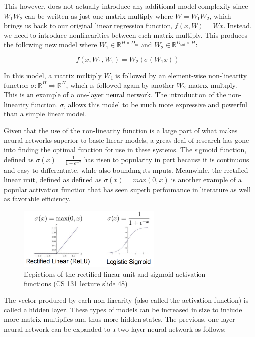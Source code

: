 \documentclass{article}
\begin{document}
This however, does not actually introduce any additional model complexity since $W_1W_2$ can be written as just one matrix multiply where $W = W_1W_2$, which brings us back to our original linear regression function, $f(x, W) = Wx$. Instead, we need to introduce nonlinearities between each matrix multiply. This produces the following new model where $W_1\in \mathbb{R}^{H \times D_{in}}$ and $W_2\in \mathbb{R}^{D_{out} \times H}$:

$$f(x,W_1,W_2) = W_2(\sigma(W_1x))$$ 

In this model, a matrix multiply $W_1$ is followed by an element-wise non-linearity function $\sigma : \mathbb{R}^H \Rightarrow \mathbb{R}^H$, which is followed again by another $W_2$ matrix multiply. This is an example of a one-layer neural network. The introduction of the non-linearity function, $\sigma$, allows this model to be much more expressive and powerful than a simple linear model.  

Given that the use of the non-linearity function is a large part of what makes neural networks superior to basic linear models, a great deal of research has gone into finding the optimal function for use in these systems. The sigmoid function, defined as $\sigma(x) = \frac{1}{1+e^{-x}}$ has risen to popularity in part because it is continuous and easy to differentiate, while also bounding its inputs. Meanwhile, the rectified linear unit, defined as defined as $\sigma(x) = max(0,x)$ is another example of a popular activation function that has seen superb performance in literature as well as favorable efficiency.

\begin{figure}[h]
\includegraphics[width=7cm]{activation_functions.png}
\centering
\caption{Depictions of the rectified linear unit and sigmoid activation functions (CS 131 lecture slide 48)}
\end{figure}

The vector produced by each non-linearity (also called the activation function) is called a hidden layer. These types of models can be increased in size to include more matrix multiplies and thus more hidden states. The previous, one-layer neural network can be expanded to a two-layer neural network as follows:
\end{document}
